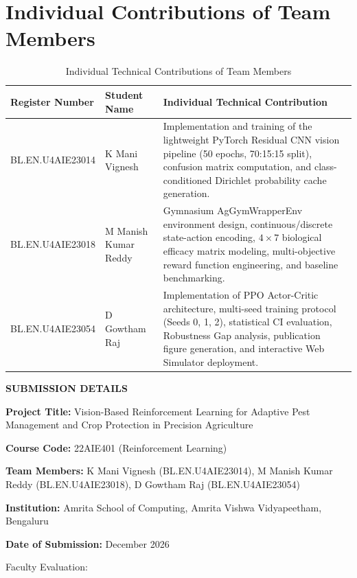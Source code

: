 \documentclass[12pt,a4paper]{report}
\begin{document}
\chapter{Individual Contributions of Team Members}

\begin{table}[H]
\centering
\caption{Individual Technical Contributions of Team Members}
\label{tab:contributions}
\begin{tabular}{p{3.2cm}p{3.8cm}p{7.5cm}}
\toprule
\textbf{Register Number} & \textbf{Student Name} & \textbf{Individual Technical Contribution} \\
\midrule
BL.EN.U4AIE23014 & K Mani Vignesh & Implementation and training of the lightweight PyTorch Residual CNN vision pipeline (50 epochs, 70:15:15 split), confusion matrix computation, and class-conditioned Dirichlet probability cache generation. \\
\midrule
BL.EN.U4AIE23018 & M Manish Kumar Reddy & Gymnasium AgGymWrapperEnv environment design, continuous/discrete state-action encoding, $4 \times 7$ biological efficacy matrix modeling, multi-objective reward function engineering, and baseline benchmarking. \\
\midrule
BL.EN.U4AIE23054 & D Gowtham Raj & Implementation of PPO Actor-Critic architecture, multi-seed training protocol (Seeds 0, 1, 2), statistical CI evaluation, Robustness Gap analysis, publication figure generation, and interactive Web Simulator deployment. \\
\bottomrule
\end{tabular}
\end{table}

\vspace{1.5cm}
\noindent\textbf{\large SUBMISSION DETAILS}\par
\vspace{0.4cm}
\noindent\textbf{Project Title:} Vision-Based Reinforcement Learning for Adaptive Pest Management and Crop Protection in Precision Agriculture\par
\noindent\textbf{Course Code:} 22AIE401 (Reinforcement Learning)\par
\noindent\textbf{Team Members:} K Mani Vignesh (BL.EN.U4AIE23014), M Manish Kumar Reddy (BL.EN.U4AIE23018), D Gowtham Raj (BL.EN.U4AIE23054)\par
\noindent\textbf{Institution:} Amrita School of Computing, Amrita Vishwa Vidyapeetham, Bengaluru\par
\noindent\textbf{Date of Submission:} December 2026\par
\vspace{0.8cm}
\noindent Faculty Evaluation: \hrulefill
\end{document}

